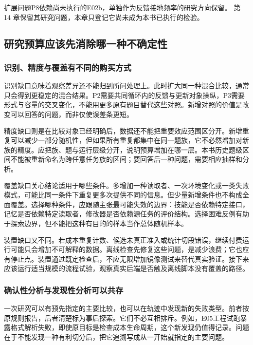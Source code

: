 扩展问题P8依赖尚未执行的E02b，单独作为反馈接地频率的研究方向保留。
第 14 章保留其研究问题，本章只登记它尚未成为本书已执行的检验。


\subsection{研究预算应该先消除哪一种不确定性}
\label{sec:ch16-information}

\subsubsection{识别、精度与覆盖有不同的购买方式}

识别缺口意味着观察差异还不能归到所问处理上。此时扩大同一种混合比较，通常只会得到更稳定的混合结果。P2需要共同循环内的反馈与更新对象操纵，P3需要形式与容量的交叉变化，不能用更多原有题目替代这些对照。新增对照的价值是改变可以回答的问题，而非仅使误差条更短。

精度缺口则是在比较对象已经明确后，数据还不能把重要效应范围区分开。新增重复可以减少一部分随机性，但如果所有重复都集中在同一题族，它不必然增加对新族的精度。应把族、题与运行层级分开，说明预算增加在哪一层。本书历史题级区间不能被重新命名为跨任意任务族的区间；要回答后一种问题，需要相应抽样和分析。

覆盖缺口关心结论适用于哪些条件。多增加一种读取者、一次环境变化或一类失败模式，可能比同一条件下重复更多次提供不同的信息。但少量新增条件也不构成全面覆盖。选择哪种条件，应跟随主张最可能失效的边界：技能是否依赖特定接口，记忆是否依赖特定读取者，修改器是否依赖源任务的评价结构。选择困难反例有助于探索边界，但不能把这种有目的的样本当作总体随机样本。

装置缺口又不同。若成本重复计数、候选未真正准入或统计切段错误，继续付费运行可能只会增加不可解释的数据。离线检查先修复这些问题，是减少浪费；它也应有停止点。装置通过既定检查后，不应无限增加镜像测试来替代真实验证。接下来应该运行适当规模的流程试验，观察真实后端是否触及离线脚本没有覆盖的路径。

\subsubsection{确认性分析与发现性分析可以共存}

一次研究可以有预先指定的主要比较，也可以在轨迹中发现新的失败类型。前者按原规则报告，后者清楚标为事后探索。它们不必互相排斥。例如，E05工程试跑暴露格式解析失败，即使原目标是检查成本生命周期，这个新发现仍值得记录。问题在于不能发现一种有利切分后，把它追溯写成从一开始就指定的主要问题。

